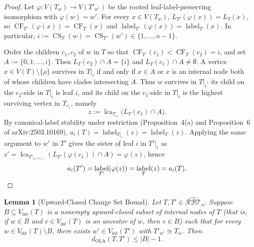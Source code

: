 \documentclass[11pt]{article}
\newtheorem{lemma}[theorem]{Lemma}
\theoremstyle{definition}
\theoremstyle{remark}
\DeclareMathOperator{\lca}{lca}
\DeclareMathOperator{\CF}{CF}
\DeclareMathOperator{\CS}{CS}
\DeclareMathOperator{\labelop}{label}
\begin{document}
\begin{proof}
Let $\varphi : V(T_w) \to V(T'_{w'})$ be the rooted leaf-label-preserving isomorphism with $\varphi(w) = w'$. For every $x \in V(T_w)$, $L_{T'}(\varphi(x)) = L_T(x)$, so $\CF_{T'}(\varphi(x)) = \CF_T(x)$ and $\labelop_{T'}(\varphi(x)) = \labelop_T(x)$. In particular, $i := \CS_T(w) = \CS_{T'}(w') \in \{1, \dots, n-1\}$.

Order the children $c_1, c_2$ of $w$ in $T$ so that $\CF_T(c_1) < \CF_T(c_2) = i$, and set $A := \{0, 1, \dots, i\}$. Then $L_T(c_2) \cap A = \{i\}$ and $L_T(c_1) \cap A \neq \emptyset$. A vertex $x \in V(T) \setminus \{\rho\}$ survives in $T|_i$ if and only if $x \in A$ or $x$ is an internal node both of whose children have clades intersecting $A$. Thus $w$ survives in $T|_i$: its child on the $c_2$-side in $T|_i$ is leaf $i$, and its child on the $c_1$-side in $T|_i$ is the highest surviving vertex in $T_{c_1}$, namely
\[
  z := \lca_{T_{c_1}}\!\bigl(L_T(c_1) \cap A\bigr).
\]
By canonical-label stability under restriction (Proposition~4(a) and Proposition~6 of arXiv:2503.10169), $a_i(T) = \labelop_{T|_i}(z) = \labelop_T(z)$. Applying the same argument to $w'$ in $T'$ gives the sister of leaf $i$ in $T'|_i$ as $z' = \lca_{T'_{\varphi(c_1)}}(L_{T'}(\varphi(c_1)) \cap A) = \varphi(z)$, hence
\[
  a_i(T') = \labelop_{T'}(\varphi(z)) = \labelop_T(z) = a_i(T). \qedhere
\]
\end{proof}

\begin{lemma}[Upward-Closed Change Set Bound]\label{lem:upward}
Let $T, T' \in \widehat{\mathcal{RBT}}_n$. Suppose $B \subseteq V_{\mathrm{int}}(T)$ is a nonempty upward-closed subset of internal nodes of $T$ (that is, if $w \in B$ and $v \in V_{\mathrm{int}}(T)$ is an ancestor of $w$, then $v \in B$) such that for every $w \in V_{\mathrm{int}}(T) \setminus B$, there exists $w' \in V_{\mathrm{int}}(T')$ with $T'_{w'} \cong T_w$. Then
\[
  d_{\mathrm{OLA}}(T, T') \le |B| - 1.
\]
\end{lemma}
\end{document}
